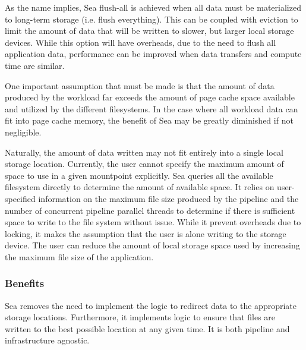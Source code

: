 As the name implies, Sea flush-all is achieved when all data must be
materialized to long-term storage (i.e. flush everything). This can be coupled
with eviction to limit the amount of data that will be written to slower, but
larger local storage devices. While this option will have overheads, due to the
need to flush all application data, performance can be improved when data
transfers and compute time are similar. 


One important assumption that must be made is that the amount of data produced
by the workload far exceeds the amount of page cache space available and
utilized by the different filesystems. In the case where all workload data can
fit into page cache memory, the benefit of Sea may be greatly diminished if not
negligible.

Naturally, the amount of data written may not fit entirely into a single local
storage location. Currently, the user cannot specify the maximum amount of space
to use in a given mountpoint explicitly. Sea queries all the available
filesystem directly to determine the amount of available space. It relies on
user-specified information on the maximum file size produced by the pipeline and
the number of concurrent pipeline parallel threads to determine if there is
sufficient space to write to the file system without issue. While it prevent
overheads due to locking, it makes the assumption that the user is alone writing
to the storage device. The user can reduce the amount of local storage space
used by increasing the maximum file size of the application.



\subsubsection{Benefits}
Sea removes the need to implement the logic to redirect data to the appropriate
storage locations. Furthermore, it implements logic to ensure that files are
written to the best possible location at any given time. It is both pipeline and
infrastructure agnostic.

